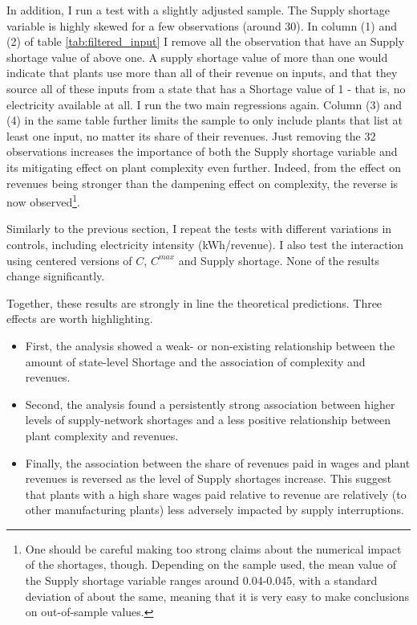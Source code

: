 \documentclass[11pt]{article}
\begin{document}
In addition, I run a test with a slightly adjusted sample. The Supply shortage variable is highly skewed for a few observations (around 30). In column (1) and (2) of table \ref{tab:filtered_input} I remove all the observation that have an Supply shortage value of above one. A supply shortage value of more than one would indicate that plants use more than all of their revenue on inputs, and that they source all of these inputs from a state that has a Shortage value of 1 -  that is, no electricity available at all. I run the two main regressions again. Column (3) and (4) in the same table further limits the sample to only include plants that list at least one input, no matter its share of their revenues. Just removing the 32 observations increases the importance of both the Supply shortage variable and its mitigating effect on plant complexity even further. Indeed, from the effect on revenues being stronger than the dampening effect on complexity, the reverse is now observed\footnote{One should be careful making too strong claims about the numerical impact of the shortages, though. Depending on the sample used, the mean value of the Supply shortage variable ranges around 0.04-0.045, with a standard deviation of about the same, meaning that it is very easy to make conclusions on out-of-sample values.}.

Similarly to the previous section, I repeat the tests with different variations in controls, including electricity intensity (kWh/revenue). I also test the interaction using centered versions of $C$, $C^{max}$ and Supply shortage. None of the results change significantly. 

Together, these results are strongly in line the theoretical predictions. Three effects are worth highlighting. 

\begin{itemize}
	\item First, the analysis showed a weak- or non-existing relationship between the amount of state-level Shortage and the association of complexity and revenues.
	\item Second, the analysis found a persistently strong association between higher levels of supply-network shortages and a less positive relationship between plant complexity and revenues.

	\item Finally, the association between the share of revenues paid in wages and plant revenues is reversed as the level of Supply shortages increase. This suggest that plants with a high share wages paid relative to revenue are relatively (to other manufacturing plants) less adversely impacted by supply interruptions.
	\end{itemize}
\end{document}
